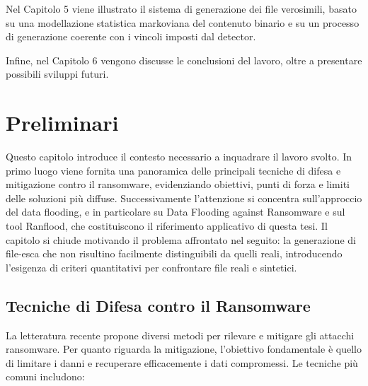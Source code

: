 \documentclass{report}
\begin{document}
\bigskip

Nel Capitolo 5 viene illustrato il sistema di generazione dei file verosimili,
basato su una modellazione statistica markoviana del contenuto binario 
e su un processo di generazione coerente con i vincoli imposti dal detector.

\bigskip

Infine, nel Capitolo 6 vengono discusse le conclusioni del lavoro, oltre a presentare possibili sviluppi futuri.




\chapter{Preliminari}

Questo capitolo introduce il contesto necessario a inquadrare il lavoro svolto.
In primo luogo viene fornita una panoramica delle principali tecniche di difesa e mitigazione
contro il ransomware, evidenziando obiettivi, punti di forza e limiti delle soluzioni più diffuse.
Successivamente l’attenzione si concentra sull’approccio del data flooding, e in particolare su
Data Flooding against Ransomware e sul tool Ranflood, che costituiscono il riferimento
applicativo di questa tesi. Il capitolo si chiude motivando il problema affrontato nel seguito:
la generazione di file-esca che non risultino facilmente distinguibili da quelli reali, introducendo
l’esigenza di criteri quantitativi per confrontare file reali e sintetici.


\section{Tecniche di Difesa contro il Ransomware}
La letteratura recente propone diversi metodi per rilevare e mitigare gli attacchi ransomware.
Per quanto riguarda la mitigazione, l'obiettivo fondamentale è quello di limitare i danni e recuperare efficacemente i dati compromessi.
Le tecniche più comuni includono:
\end{document}

